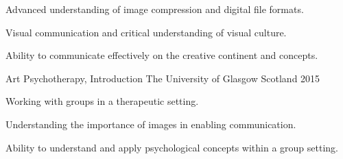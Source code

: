 \begin{cventries}
{\begin{cvitems}
        \item{Advanced understanding of image compression and digital file formats.}
        \item{Visual communication and critical understanding of visual culture.}
        \item{Ability to communicate effectively on the creative continent and concepts. }
      \end{cvitems}
    }
\cventry
    {Art Psychotherapy, Introduction} %
    {\newline The University of Glasgow} %
    {Scotland} %
    {2015} %
    {
      \begin{cvitems} %
        \item {Working with groups in a therapeutic setting.}
        \item{Understanding the  importance of images in enabling communication.}
        \item{Ability to understand and apply psychological concepts within a group setting.}
      \end{cvitems}
    }
\end{cventries}

